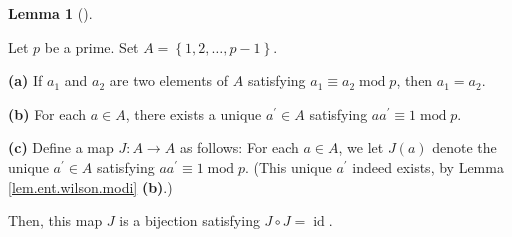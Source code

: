 \documentclass[numbers=enddot,12pt,final,onecolumn,notitlepage]{scrartcl}%
\numberwithin{exer}{subsection}
\theoremstyle{definition}
\newtheorem{lem}[theo]{Lemma}
\newenvironment{lemma}[1][]
{\begin{lem}[#1]\begin{leftbar}}
{\end{leftbar}\end{lem}}
\begin{document}
\begin{lemma}
\label{lem.ent.wilson.modi}Let $p$ be a prime. Set $A=\left\{  1,2,\ldots
,p-1\right\}  $.

\textbf{(a)} If $a_{1}$ and $a_{2}$ are two elements of $A$ satisfying
$a_{1}\equiv a_{2}\operatorname{mod}p$, then $a_{1}=a_{2}$.

\textbf{(b)} For each $a\in A$, there exists a unique $a^{\prime}\in A$
satisfying $aa^{\prime}\equiv1\operatorname{mod}p$.

\textbf{(c)} Define a map $J:A\rightarrow A$ as follows: For each $a\in A$, we
let $J\left(  a\right)  $ denote the unique $a^{\prime}\in A$ satisfying
$aa^{\prime}\equiv1\operatorname{mod}p$. (This unique $a^{\prime}$ indeed
exists, by Lemma \ref{lem.ent.wilson.modi} \textbf{(b)}.)

Then, this map $J$ is a bijection satisfying $J\circ J=\operatorname*{id}$.
\end{lemma}
\end{document}
